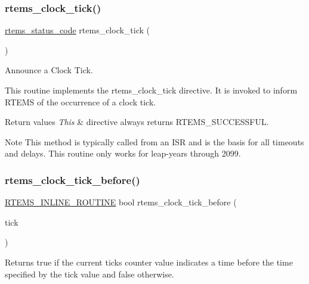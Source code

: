 \subsubsection{\texorpdfstring{rtems\_clock\_tick()}{rtems\_clock\_tick()}}
{\footnotesize\ttfamily \mbox{\hyperlink{group__ClassicStatus_ga545d41846817eaba6143d52ee4d9e9fe}{rtems\+\_\+status\+\_\+code}} rtems\+\_\+clock\+\_\+tick (\begin{DoxyParamCaption}\item[{void}]{ }\end{DoxyParamCaption})}



Announce a Clock Tick. 

This routine implements the rtems\+\_\+clock\+\_\+tick directive. It is invoked to inform R\+T\+E\+MS of the occurrence of a clock tick.


\begin{DoxyRetVals}{Return values}
{\em This} & directive always returns R\+T\+E\+M\+S\+\_\+\+S\+U\+C\+C\+E\+S\+S\+F\+UL.\\
\hline
\end{DoxyRetVals}
\begin{DoxyNote}{Note}
This method is typically called from an I\+SR and is the basis for all timeouts and delays. This routine only works for leap-\/years through 2099. 
\end{DoxyNote}
\mbox{\label{group__ClassicClock_gad317482772596398e87ca46163d4835e}} 
\subsubsection{\texorpdfstring{rtems\_clock\_tick\_before()}{rtems\_clock\_tick\_before()}}
{\footnotesize\ttfamily \mbox{\hyperlink{group__RTEMSScoreBaseDefs_gac216239df231d5dbd15e3520b0b9313f}{R\+T\+E\+M\+S\+\_\+\+I\+N\+L\+I\+N\+E\+\_\+\+R\+O\+U\+T\+I\+NE}} bool rtems\+\_\+clock\+\_\+tick\+\_\+before (\begin{DoxyParamCaption}\item[{\mbox{\hyperlink{group__ClassicTasks_gad39c43f949683d46874e3a5586b93aee}{rtems\+\_\+interval}}}]{tick }\end{DoxyParamCaption})}



Returns true if the current ticks counter value indicates a time before the time specified by the tick value and false otherwise. 


